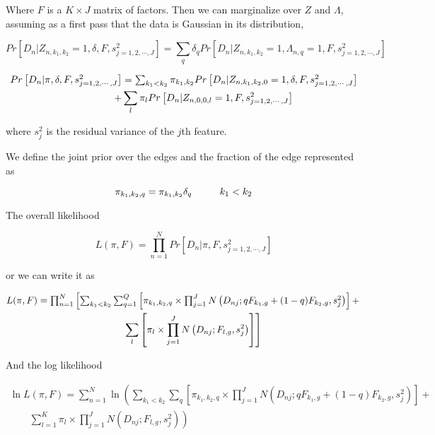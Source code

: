 \documentclass[12pt]{article}
\begin{document}
Where $F$ is a $K\times J$ matrix of factors. 
Then we can marginalize over $Z$ and $\Lambda$, assuming as a first pass 
that the data is Gaussian in its distribution,

$$ Pr \left [ D_{n} | Z_{n, k_1, k_2}=1, \delta, F, s^2_{j=1,2,\cdots,J} \right ] = \sum_{q} \delta_{q} Pr \left [D_{n} | Z_{n, k_1, k_2}=1, \Lambda_{n, q}=1, F, s^2_{j=1,2,\cdots,J} \right ] $$

\begin{multline}
 $$ Pr \left [ D_{n} | \pi, \delta, F, s^2_{j=1,2,\cdots,J} \right ] = \sum_{k_1 < k_2}
 \pi_{k_1, k_2} Pr \left [ D_{n} | Z_{n, k_1, k_2, 0}=1, \delta, F, s^2_{j=1,2,\cdots,J} \right ]  \\
   \qquad \qquad +  \sum_{l} \pi_{l} Pr \left [ D_{n} | Z_{n, 0, 0, l}=1,  F, s^2_{j=1,2,\cdots,J} \right ]$$
 \end{multline}
 
 

where $s^2_{j}$ is the residual variance of the $j$th feature.
 
We define the joint prior over the edges and the fraction of the edge represented as 

$$ \pi_{k_1,k_2, q} = \pi_{k_1, k_2} \delta_{q} \hspace{1 cm} k_1 < k_2 $$

The overall likelihood 

$$ L(\pi, F) = \prod_{n=1}^{N} Pr \left [ D_{n} | \pi, F, s^2_{j=1,2,\cdots,J} \right ] $$

or we can write it as 

\begin{multline}
$$L(\pi, F) = \prod_{n=1}^{N} \left [ \sum_{k_1 < k_2} \sum_{q=1}^{Q} \left [ \pi_{k_1,k_2, q} \times \prod_{j=1}^{J} N \left (D_{nj}; q F_{k_1,g} + (1-q) F_{k_2, g}, s^2_{j} \right) \right ]   + \right. \\
\left.   \qquad \sum_{l} \left [ \pi_{l} \times \prod_{j=1}^{J} N \left (D_{nj}; F_{l,g} , s^2_{j} \right) \right ] \right]$$
\end{multline}

And the log likelihood

\begin{multline}
\ln {L (\pi, F)} = \sum_{n=1}^{N} \ln \left (\sum_{k_1 < k_2} \sum_{q} \left [ \pi_{k_1,k_2, q} \times \prod_{j=1}^{J} N \left (D_{nj}; q F_{k_1,g} + (1-q) F_{k_2, g}, s^2_{j} \right) \right ] + \right . \\
\left. \qquad \sum_{l=1}^{K} \pi_{l}  \times \prod_{j=1}^{J} N \left (D_{nj}; F_{l,g}, s^2_{j} \right)\right )
\end{multline}
\end{document}
